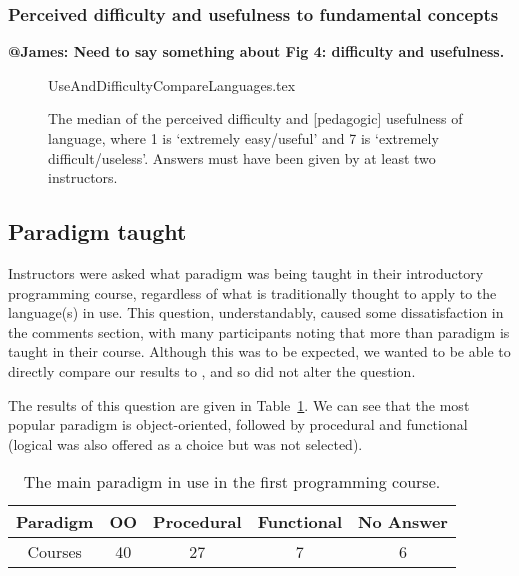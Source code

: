 \documentclass{sig-alternate}
\begin{document}
\subsubsection{Perceived difficulty and usefulness to fundamental concepts}
{\bf{@James: Need to say something about Fig 4: difficulty and usefulness.}}



\begin{figure}
\begin{center}
{UseAndDifficultyCompareLanguages.tex}
\end{center}\vskip-18pt
\caption{The median of the perceived difficulty and [pedagogic] usefulness of language, where 1 is `extremely easy/useful' and 7 is `extremely difficult/useless'.  Answers must have been given by at least two instructors.\label{fig:utility}}
\end{figure}

\subsection{Paradigm taught}

Instructors were asked what paradigm was being taught in their introductory programming course, regardless of what is traditionally thought to apply to the language(s) in use. This question, understandably, caused some dissatisfaction in the comments section, with many participants noting that more than paradigm is taught in their course. Although this was to be expected, we wanted to be able to directly compare our results to \cite{mason+cooper:2014}, and so did not alter the question.

The results of this question are given in Table~\ref{tab:paradigm}. We can see that the most popular paradigm is object-oriented, followed by procedural and functional (logical was also offered as a choice but was not selected). 

\begin{table}[ht]
\centering
\caption{The main paradigm in use in the first programming course.}
\label{tab:paradigm}
\begin{tabular}{ccccc}
\hline
Paradigm & OO & Procedural & Functional & No Answer \\ \hline
Courses  & 40              & 27         & 7    & 6      \\ \hline
\end{tabular}
\end{table}
\end{document}
